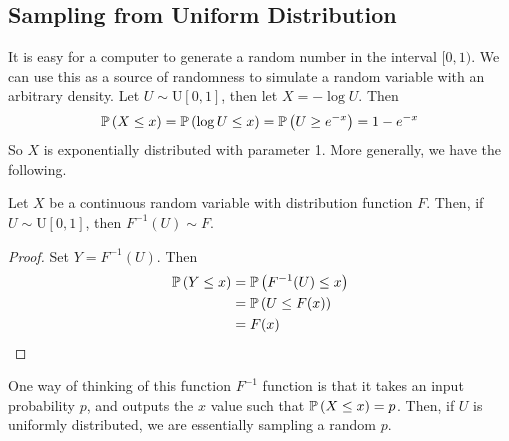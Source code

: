 \subsection{Sampling from Uniform Distribution}
It is easy for a computer to generate a random number in the interval \([0, 1)\). We can use this as a source of randomness to simulate a random variable with an arbitrary density. Let \(U \sim \mathrm{U}[0, 1]\), then let \(X = -\log U\). Then
\[ \mathbb{P}\left({X \leq x}\right) = \mathbb{P}\left({\log U \leq x}\right) = \mathbb{P}\left({U \geq e^{-x}}\right) = 1-e^{-x} \]
So \(X\) is exponentially distributed with parameter 1. More generally, we have the following.
\begin{theorem}
	Let \(X\) be a continuous random variable with distribution function \(F\). Then, if \(U \sim \mathrm{U}[0, 1]\), then \(F^{-1}(U) \sim F\).
\end{theorem}
\begin{proof}
	Set \(Y = F^{-1}(U)\). Then
	\begin{align*}
		\mathbb{P}\left({Y \leq x}\right) & = \mathbb{P}\left({F^{-1}(U) \leq x}\right) \\
		                & = \mathbb{P}\left({U \leq F(x)}\right)      \\
		                & = F(x)
	\end{align*}
\end{proof}
\noindent One way of thinking of this function \(F^{-1}\) function is that it takes an input probability \(p\), and outputs the \(x\) value such that \(\mathbb{P}\left({X \leq x}\right) = p\). Then, if \(U\) is uniformly distributed, we are essentially sampling a random \(p\).

